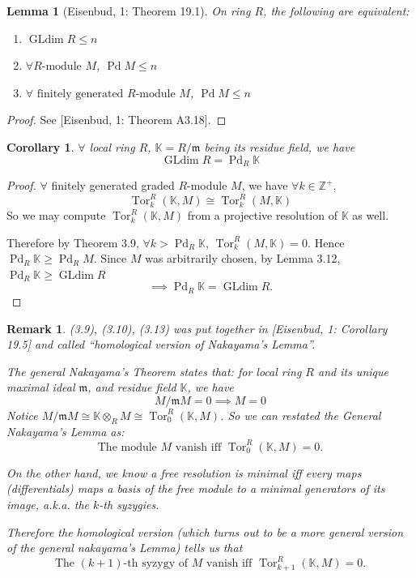 \documentclass[11pt]{article}
\DeclareMathOperator{\Tor}{Tor}
\DeclareMathOperator{\Pd}{Pd}
\DeclareMathOperator{\GLdim}{GLdim}
\newtheorem{lemma}[theorem]{Lemma}
\newtheorem{corollary}[theorem]{Corollary}
\newtheorem{remark}[theorem]{Remark}
\begin{document}
\begin{lemma}[Eisenbud, 1: Theorem 19.1]
    On ring $R$, the following are equivalent:
    \begin{enumerate}
        \item[i)] $\GLdim R \le n$
        \item[ii)] $\forall R\text{-module } M$, $\Pd M \le n$
        \item[iii)] $\forall \text{ finitely generated } R\text{-module } M$, $\Pd M \le n$
    \end{enumerate}
\end{lemma}
\begin{proof}
    See [Eisenbud, 1: Theorem A3.18].
\end{proof}

\begin{corollary}
    $\forall$ local ring $R$, $\mathbb{K} = R/\mathfrak{m}$ being its residue field, we have
    $$ \GLdim R = \Pd_R \mathbb{K} $$
\end{corollary}
\begin{proof}
    $\forall$ finitely generated graded $R$-module $M$, we have $\forall k \in \mathbb{Z}^+$,
    $$ \Tor_k^R(\mathbb{K}, M) \cong \Tor_k^R(M, \mathbb{K}) $$
    So we may compute $\Tor_k^R(\mathbb{K}, M)$ from a projective resolution of $\mathbb{K}$ as well.

    Therefore by Theorem 3.9, $\forall k > \Pd_R \mathbb{K}$, $\Tor_k^R(M, \mathbb{K}) = 0$.
    Hence $\Pd_R \mathbb{K} \ge \Pd_R M$.
    Since $M$ was arbitrarily chosen, by Lemma 3.12, $\Pd_R \mathbb{K} \ge \GLdim R$
    $$ \implies \Pd_R \mathbb{K} = \GLdim R. $$
\end{proof}

\begin{remark}
    (3.9), (3.10), (3.13) was put together in [Eisenbud, 1: Corollary 19.5] and called ``homological version of Nakayama's Lemma''.

    The general Nakayama's Theorem states that: for local ring $R$ and its unique maximal ideal $\mathfrak{m}$, and residue field $\mathbb{K}$,
    we have
    $$
    M / \mathfrak{m}M=0\implies M=0
    $$
    Notice $M / \mathfrak{m}M\cong \mathbb{K}\otimes _{R}M\cong\Tor_{0}^{R}(\mathbb{K},M)$.
    So we can restated the General Nakayama's Lemma as:
    $$
    \text{The module }M\text{ vanish iff }\Tor_{0}^{R}(\mathbb{K},M)=0.
    $$

    On the other hand, we know a free resolution is minimal 
    iff every maps (differentials) maps a basis of the free module to a minimal generators of its image, a.k.a. the $k$-th syzygies.

    Therefore the homological version (which turns out to be a more general version of the general nakayama's Lemma) tells us that 
    $$
    \text{The }(k+1)\text{-th syzygy of }M\text{ vanish iff }\Tor_{k+1}^{R}(\mathbb{K},M)=0.
    $$
    
\end{remark}
\end{document}
